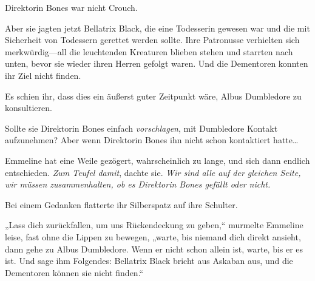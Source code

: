 Direktorin Bones war nicht Crouch.

Aber sie jagten jetzt Bellatrix Black, die eine Todesserin gewesen war und die mit Sicherheit von Todessern gerettet werden sollte. Ihre Patronusse verhielten sich merkwürdig—all die leuchtenden Kreaturen blieben stehen und starrten nach unten, bevor sie wieder ihren Herren gefolgt waren. Und die Dementoren konnten ihr Ziel nicht finden.

Es schien ihr, dass dies ein äußerst guter Zeitpunkt wäre, Albus Dumbledore zu konsultieren.

Sollte sie Direktorin Bones einfach \emph{vorschlagen}, mit Dumbledore Kontakt aufzunehmen? Aber wenn Direktorin Bones ihn nicht schon kontaktiert hatte…

Emmeline hat eine Weile gezögert, wahrscheinlich zu lange, und sich dann endlich entschieden. \emph{Zum Teufel damit}, dachte sie. \emph{Wir sind alle auf der gleichen Seite, wir müssen zusammenhalten, ob es Direktorin Bones gefällt oder nicht.}

Bei einem Gedanken flatterte ihr Silberspatz auf ihre Schulter.

„Lass dich zurückfallen, um uns Rückendeckung zu geben,“ murmelte Emmeline leise, fast ohne die Lippen zu bewegen, „warte, bis niemand dich direkt ansieht, dann gehe zu Albus Dumbledore. Wenn er nicht schon allein ist, warte, bis er es ist. Und sage ihm Folgendes: Bellatrix Black bricht aus Askaban aus, und die Dementoren können sie nicht finden.“

